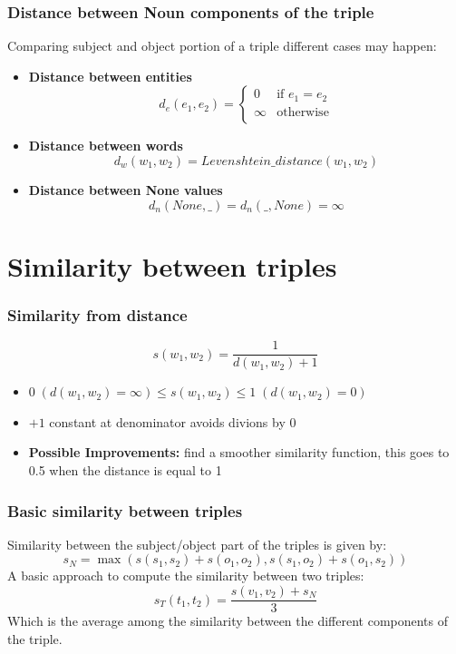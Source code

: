 \documentclass{beamer}
\begin{document}
\begin{frame}
\frametitle{Distance between Noun components of the triple}
Comparing subject and object portion of a triple different cases may happen:
\begin{itemize}
\item {{\bf Distance between entities}}
\[
d_{e} (e_{1}, e_{2}) =
\begin{cases}
0 & \text{if } e_{1} = e_{2} \\
\infty & \text{otherwise}\\
\end{cases}
\]

\item {{\bf Distance between words}}
$$
d_{w} (w_{1}, w_{2}) = Levenshtein\_distance (w_{1}, w_{2})
$$

\item {{\bf Distance between None values}}
$$
d_{n} (None, \_) = d_{n} (\_, None) = \infty
$$
\end{itemize}
\end{frame}

\section{Similarity between triples}
\begin{frame}
\frametitle{Similarity from distance}
$$
s (w_{1}, w_{2}) = \frac{1}{d (w_{1}, w_{2}) + 1}
$$
\begin{itemize}
\item $0 \; (d (w_{1}, w_{2}) = \infty) \leq s (w_{1}, w_{2}) \leq 1 \;
  (d (w_{1}, w_{2}) = 0)$
\item $+ 1$ constant at denominator avoids divions by 0
\item {{\bf Possible Improvements:}} find a smoother similarity
  function, this goes to 0.5 when the distance is equal to 1
\end{itemize}
\end{frame}

\begin{frame}
\frametitle{Basic similarity between triples}
Similarity between the subject/object part of the triples is given by:
$$
s_{N} =  \max(s (s_{1}, s_{2}) + s (o_{1}, o_{2}), s (s_{1}, o_{2}) + s (o_{1}, s_{2}))
$$
A basic approach to compute the similarity between two triples:
$$
s_{T}(t_{1}, t_{2}) = \frac{s(v_{1}, v_{2}) + s_{N}}{3}
$$
Which is the average among the similarity between the different
components of the triple.
\end{frame}
\end{document}
